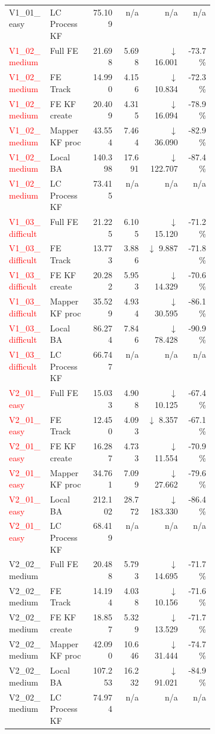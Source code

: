 \documentclass[11pt]{article}
\begin{document}
\begin{longtable}{@{}>{\raggedright\arraybackslash}p{0.20\linewidth}>{\raggedright\arraybackslash}p{0.20\linewidth}rrrr@{}}
V1\_01\_easy & LC ProcessKF & 75.109 & n/a & n/a & n/a \\
\textcolor{red}{V1\_02\_medium} & Full FE & 21.698 & 5.698 & $\downarrow$ 16.001 & -73.7\% \\
\textcolor{red}{V1\_02\_medium} & FE Track & 14.990 & 4.156 & $\downarrow$ 10.834 & -72.3\% \\
\textcolor{red}{V1\_02\_medium} & FE KF create & 20.409 & 4.315 & $\downarrow$ 16.094 & -78.9\% \\
\textcolor{red}{V1\_02\_medium} & Mapper KF proc & 43.554 & 7.464 & $\downarrow$ 36.090 & -82.9\% \\
\textcolor{red}{V1\_02\_medium} & Local BA & 140.398 & 17.691 & $\downarrow$ 122.707 & -87.4\% \\
\textcolor{red}{V1\_02\_medium} & LC ProcessKF & 73.415 & n/a & n/a & n/a \\
\textcolor{red}{V1\_03\_difficult} & Full FE & 21.225 & 6.105 & $\downarrow$ 15.120 & -71.2\% \\
\textcolor{red}{V1\_03\_difficult} & FE Track & 13.773 & 3.886 & $\downarrow$ 9.887 & -71.8\% \\
\textcolor{red}{V1\_03\_difficult} & FE KF create & 20.282 & 5.953 & $\downarrow$ 14.329 & -70.6\% \\
\textcolor{red}{V1\_03\_difficult} & Mapper KF proc & 35.529 & 4.934 & $\downarrow$ 30.595 & -86.1\% \\
\textcolor{red}{V1\_03\_difficult} & Local BA & 86.274 & 7.846 & $\downarrow$ 78.428 & -90.9\% \\
\textcolor{red}{V1\_03\_difficult} & LC ProcessKF & 66.747 & n/a & n/a & n/a \\
\textcolor{red}{V2\_01\_easy} & Full FE & 15.033 & 4.908 & $\downarrow$ 10.125 & -67.4\% \\
\textcolor{red}{V2\_01\_easy} & FE Track & 12.450 & 4.093 & $\downarrow$ 8.357 & -67.1\% \\
\textcolor{red}{V2\_01\_easy} & FE KF create & 16.287 & 4.733 & $\downarrow$ 11.554 & -70.9\% \\
\textcolor{red}{V2\_01\_easy} & Mapper KF proc & 34.761 & 7.099 & $\downarrow$ 27.662 & -79.6\% \\
\textcolor{red}{V2\_01\_easy} & Local BA & 212.102 & 28.772 & $\downarrow$ 183.330 & -86.4\% \\
\textcolor{red}{V2\_01\_easy} & LC ProcessKF & 68.419 & n/a & n/a & n/a \\
V2\_02\_medium & Full FE & 20.488 & 5.793 & $\downarrow$ 14.695 & -71.7\% \\
V2\_02\_medium & FE Track & 14.194 & 4.038 & $\downarrow$ 10.156 & -71.6\% \\
V2\_02\_medium & FE KF create & 18.857 & 5.329 & $\downarrow$ 13.529 & -71.7\% \\
V2\_02\_medium & Mapper KF proc & 42.090 & 10.646 & $\downarrow$ 31.444 & -74.7\% \\
V2\_02\_medium & Local BA & 107.253 & 16.232 & $\downarrow$ 91.021 & -84.9\% \\
V2\_02\_medium & LC ProcessKF & 74.974 & n/a & n/a & n/a \\
\end{longtable}
\end{document}
